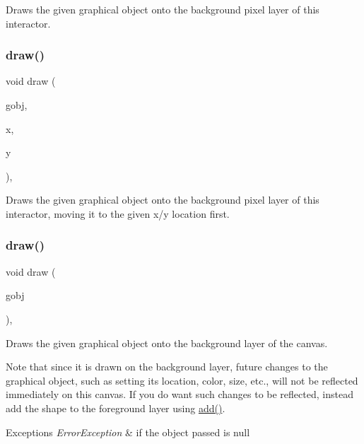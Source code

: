 Draws the given graphical object onto the background pixel layer of this interactor. 

\mbox{\label{classsgl_1_1GDrawingSurface_a8af8762bd6720e0a1d2a84b190e3dc96}} 
\subsubsection{\texorpdfstring{draw()}{draw()}\hspace{0.1cm}{\footnotesize\ttfamily [3/5]}}
{\footnotesize\ttfamily void draw (\begin{DoxyParamCaption}\item[{\mbox{\hyperlink{classsgl_1_1GObject}{G\+Object}} \&}]{gobj,  }\item[{double}]{x,  }\item[{double}]{y }\end{DoxyParamCaption})\hspace{0.3cm}{\ttfamily [virtual]}, {\ttfamily [inherited]}}



Draws the given graphical object onto the background pixel layer of this interactor, moving it to the given x/y location first. 

\mbox{\label{classsgl_1_1GCanvas_a7f7f6c1798bcedfd52151b458074e8a0}} 
\subsubsection{\texorpdfstring{draw()}{draw()}\hspace{0.1cm}{\footnotesize\ttfamily [4/5]}}
{\footnotesize\ttfamily void draw (\begin{DoxyParamCaption}\item[{\mbox{\hyperlink{classsgl_1_1GObject}{G\+Object}} $\ast$}]{gobj }\end{DoxyParamCaption})\hspace{0.3cm}{\ttfamily [override]}, {\ttfamily [virtual]}}



Draws the given graphical object onto the background layer of the canvas. 

Note that since it is drawn on the background layer, future changes to the graphical object, such as setting its location, color, size, etc., will not be reflected immediately on this canvas. If you do want such changes to be reflected, instead add the shape to the foreground layer using \mbox{\hyperlink{classsgl_1_1GCanvas_afe8277e7b2627513c6f7452fb0b2847d}{add()}}. 
\begin{DoxyExceptions}{Exceptions}
{\em Error\+Exception} & if the object passed is null \\
\hline
\end{DoxyExceptions}


